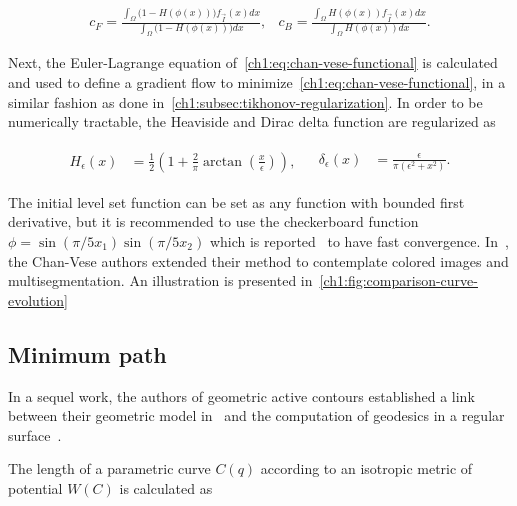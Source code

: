 \[
\begin{array}{ll}
	\displaystyle c_F = \frac{\int_{\Omega}{\big(1-H(\phi(x))\big)f_{\vec{I}}(x)dx}}{\int_{\Omega}{\big(1-H(\phi(x))\big)dx}}, & 	
	\displaystyle c_B = \frac{\int_{\Omega}{H(\phi(x))f_{\vec{I}}(x)dx}}{\int_{\Omega}{H(\phi(x))dx}}.
\end{array}
\]

Next, the Euler-Lagrange equation of~\cref{ch1:eq:chan-vese-functional} is calculated and used to define a gradient flow to minimize~\cref{ch1:eq:chan-vese-functional}, in a similar fashion as done in~\cref{ch1:subsec:tikhonov-regularization}. In order to be numerically tractable, the Heaviside and Dirac delta function are regularized as 

\[
\begin{array}{ll}

	\begin{array}{ll}
		\displaystyle H_{\epsilon}(x) &= \displaystyle \frac{1}{2}\left( 1 + \frac{2}{\pi}\arctan(\frac{x}{\epsilon}) \right),
	\end{array} & 
	
	\begin{array}{ll}
		\displaystyle \delta_{\epsilon}(x) &= \displaystyle \frac{\epsilon}{\pi(\epsilon^2 + x^2)}.
	\end{array}	

\end{array}
\]

The initial level set function can be set as any function with bounded first derivative, but it is recommended to use the checkerboard function $\phi=\sin(\pi/5 x_1)\sin(\pi/5x_2)$ which is reported~\cite{getreuer12} to have fast convergence. In~\cite{vese02}, the Chan-Vese authors extended their method to contemplate colored images and multisegmentation. An illustration is presented in~\cref{ch1:fig:comparison-curve-evolution}




\subsection{Minimum path}

In a sequel work, the authors of geometric active contours established a link between their geometric model in~\cite{caselles93} and the computation of geodesics in a regular surface~\cite{caselles97}. 

The length of a parametric curve $C(q)$ according to an isotropic metric of potential $W(C)$ is calculated as 

